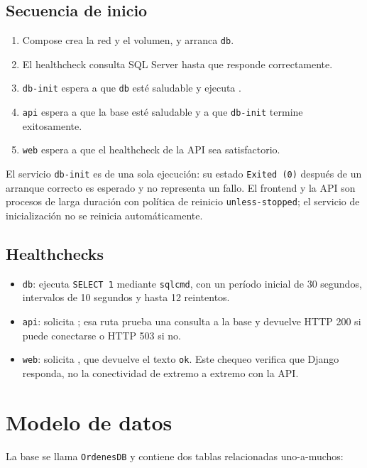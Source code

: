 \documentclass[11pt,a4paper]{article}
\newcommand{\codigo}[1]{\texttt{\detokenize{#1}}}
\newcommand{\servicio}[1]{\texttt{#1}}
\begin{document}
\subsection{Secuencia de inicio}
\begin{enumerate}
    \item Compose crea la red y el volumen, y arranca \servicio{db}.
    \item El healthcheck consulta SQL Server hasta que responde correctamente.
    \item \servicio{db-init} espera a que \servicio{db} esté saludable y ejecuta \codigo{db/init.sql}.
    \item \servicio{api} espera a que la base esté saludable y a que \servicio{db-init} termine exitosamente.
    \item \servicio{web} espera a que el healthcheck de la API sea satisfactorio.
\end{enumerate}

El servicio \servicio{db-init} es de una sola ejecución: su estado \texttt{Exited (0)} después de un arranque correcto es esperado y no representa un fallo. El frontend y la API son procesos de larga duración con política de reinicio \texttt{unless-stopped}; el servicio de inicialización no se reinicia automáticamente.

\subsection{Healthchecks}
\begin{itemize}
    \item \servicio{db}: ejecuta \texttt{SELECT 1} mediante \texttt{sqlcmd}, con un período inicial de 30 segundos, intervalos de 10 segundos y hasta 12 reintentos.
    \item \servicio{api}: solicita \codigo{/health}; esa ruta prueba una consulta a la base y devuelve HTTP 200 si puede conectarse o HTTP 503 si no.
    \item \servicio{web}: solicita \codigo{/health}, que devuelve el texto \texttt{ok}. Este chequeo verifica que Django responda, no la conectividad de extremo a extremo con la API.
\end{itemize}

\section{Modelo de datos}

La base se llama \texttt{OrdenesDB} y contiene dos tablas relacionadas uno-a-muchos:
\end{document}
